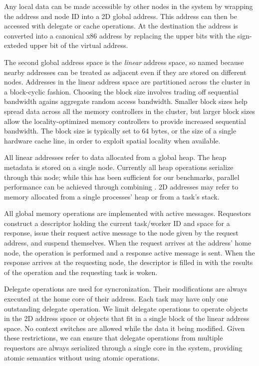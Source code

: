 Any local data can be made accessible by other nodes in the system by
wrapping the address and node ID into a 2D global address. This
address can then be accessed with delegate or cache operations. At the
destination the address is converted into a canonical x86 address by
replacing the upper bits with the sign-exteded upper bit of the
virtual address.

The second global address space is the {\em linear} address space, so
named because nearby addresses can be treated as adjacent even if they
are stored on different nodes. Addresses in the linear address space
are partitioned across the cluster in a block-cyclic fashion. Choosing
the block size involves trading off sequential bandwidth agains
aggregate random access bandwidth. Smaller block sizes help spread
data across all the memory controllers in the cluster, but larger
block sizes allow the locality-optimized memory controllers to provide
increased sequential bandwidth. The block size is typically set to 64
bytes, or the size of a single hardware cache line, in order to
exploit spatial locality when available.

All linear addresses refer to data allocated from a global heap. The
heap metadata is stored on a single node. Currently all heap
operations serialize through this node; while this has been sufficient
for our benchmarks, parallel performance can be achieved through
combining . 2D addresses may
refer to memory allocated from a single processes' heap or from a
task's stack.

All global memory operations are implemented with active
messages. Requestors construct a descriptor holding the current
task/worker ID and space for a response, issue their request active
message to the node given by the request address, and suspend
themselves. When the request arrives at the address' home node, the
operation is performed and a response active message is sent. When the
response arrives at the requesting node, the descriptor is filled in
with the results of the operation and the requesting task is woken.

Delegate operations are used for syncronization. Their modifications
are always executed at the home core of their address. Each task may
have only one outstanding delegate operation. We limit delegate
operations to operate objects in the 2D address space or objects that
fit in a single block of the linear address space. No context switches
are allowed while the data it being modified. Given these
restrictions, we can ensure that delegate operations from multiple
requestors are always serialized through a single core in the system,
providing atomic semantics without using atomic operations.

